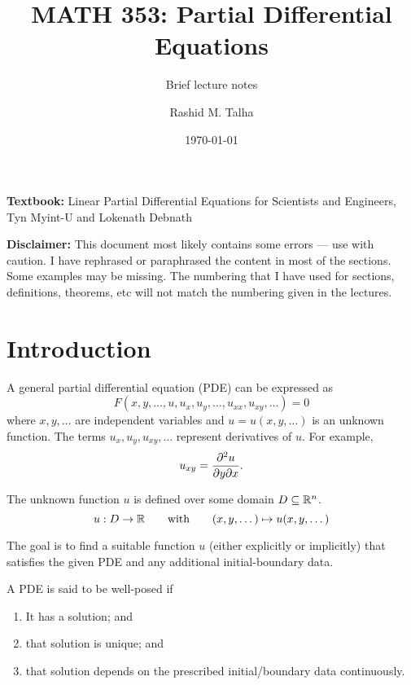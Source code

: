\documentclass[11pt]{penrose}
\title{MATH 353: Partial Differential Equations}
\subtitle{Brief lecture notes}
\author{Rashid M. Talha}
\affiliation{School of Natural Sciences, NUST}
\date{\today}
\begin{document}
\maketitle

\textbf{Textbook:} Linear Partial Differential Equations for Scientists and Engineers, Tyn Myint-U and Lokenath Debnath

\textbf{Disclaimer:} This document most likely contains some errors --- use with caution. I have rephrased or paraphrased the content in most of the sections. Some examples may be missing. The numbering that I have used for sections, definitions, theorems, etc will not match the numbering given in the lectures.

\section{Introduction}
A general partial differential equation (PDE) can be expressed as
\begin{equation}
    F(x,y,\dots, u, u_x, u_y, \dots, u_{xx}, u_{xy}, \dots) = 0
\end{equation}
where $x, y, \dots$ are independent variables and $u = u(x,y,\dots)$ is an unknown function. The terms $u_x, u_y, u_{xy}, \dots$ represent derivatives of $u$. For example,
\begin{equation*}
    u_{xy} = \frac{\partial^2 u}{\partial y \partial x}.
\end{equation*}

The unknown function $u$ is defined over some domain $D \subseteq \mathbb{R}^{n}$.
\begin{equation}
    u : D \to \mathbb{R}
    \qquad\text{with}\qquad
    (x, y, \dots) \mapsto u(x, y, \dots)
\end{equation}

The goal is to find a suitable function $u$ (either explicitly or implicitly) that satisfies the given PDE and any additional initial-boundary data.

\begin{ndfn}
    A PDE is said to be well-posed if
    \begin{enumerate}
        \item It has a solution; and
        \item that solution is unique; and
        \item that solution depends on the prescribed initial/boundary data continuously.
    \end{enumerate}
\end{ndfn}
\end{document}
